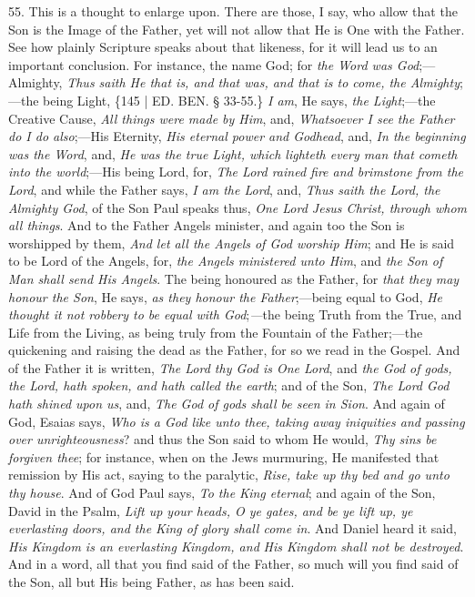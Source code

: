 55. This is a thought to
enlarge upon. There are those, I say, who allow that the Son is the
Image of the Father, yet will not allow that He is One with the
Father. See how plainly Scripture speaks about that likeness, for it
will lead us to an important conclusion. For instance, the name God;
for \emph{the Word was God};—Almighty, \emph{Thus saith He that is, and
that was, and that is to come, the Almighty};—the being Light,
\{145 | ED. BEN. § 33-55.\} \emph{I
am}, He says, \emph{the Light};—the Creative Cause, \emph{All things
were made by Him}, and, \emph{Whatsoever I see the Father do I do also};—His
Eternity, \emph{His eternal power and Godhead}, and, \emph{In the
beginning was the Word}, and, \emph{He was the true Light, which
lighteth every man that cometh into the world};—His being Lord,
for, \emph{The Lord rained fire and brimstone from the Lord}, and
while the Father says, \emph{I am the Lord}, and, \emph{Thus saith the
Lord, the Almighty God}, of the Son Paul speaks thus, \emph{One Lord
Jesus Christ, through whom all things}. And to the Father Angels
minister, and again too the Son is worshipped by them, \emph{And let all
the Angels of God worship Him}; and He is said to be Lord of the
Angels, for, \emph{the Angels ministered unto Him}, and \emph{the Son of
Man shall send His Angels}. The being honoured as the Father, for \emph{that
they may honour the Son}, He says, \emph{as they honour the Father};—being
equal to God, \emph{He thought it not robbery to be equal with God};\emph{—}the
being Truth from the True, and Life from the Living, as being truly
from the Fountain of the Father;—the quickening and raising the dead
as the Father, for so we read in the Gospel. And of the Father it is
written, \emph{The Lord thy God is One Lord}, and \emph{the God of gods,
the Lord, hath spoken, and hath called the earth}; and of the Son, \emph{The
Lord God hath shined upon us}, and, \emph{The God of gods shall be
seen in Sion}. And again of God, Esaias says, \emph{Who is a God like
unto thee, taking away iniquities and passing over unrighteousness}?
and thus the Son said to whom He would, \emph{Thy sins be forgiven thee};
for instance, when on the Jews murmuring, He manifested that remission
by His act, saying to the paralytic, \emph{Rise, take up thy bed and go
unto thy house}. And of God Paul says, \emph{To the King eternal};
and again of the Son, David in the Psalm, \emph{Lift up your heads, O ye
gates, and be ye lift up, ye everlasting doors, and the King of
glory shall come in}. And Daniel heard it said, \emph{His Kingdom is
an everlasting Kingdom, and} \emph{His Kingdom shall not be
destroyed}. And in a word, all that you find said of the Father, so
much will you find said of the Son, all but His being Father, as has
been said.

